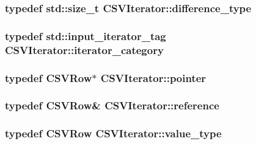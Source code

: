 \subsubsection[{\texorpdfstring{difference\+\_\+type}{difference_type}}]{\setlength{\rightskip}{0pt plus 5cm}typedef std\+::size\+\_\+t {\bf C\+S\+V\+Iterator\+::difference\+\_\+type}}\hypertarget{class_c_s_v_iterator_a2decbf132c26754c9a32402b7bc9848f}{}\label{class_c_s_v_iterator_a2decbf132c26754c9a32402b7bc9848f}
\subsubsection[{\texorpdfstring{iterator\+\_\+category}{iterator_category}}]{\setlength{\rightskip}{0pt plus 5cm}typedef std\+::input\+\_\+iterator\+\_\+tag {\bf C\+S\+V\+Iterator\+::iterator\+\_\+category}}\hypertarget{class_c_s_v_iterator_a1e8e34ec6798b67292c1b1b9bf18e8f6}{}\label{class_c_s_v_iterator_a1e8e34ec6798b67292c1b1b9bf18e8f6}
\subsubsection[{\texorpdfstring{pointer}{pointer}}]{\setlength{\rightskip}{0pt plus 5cm}typedef {\bf C\+S\+V\+Row}$\ast$ {\bf C\+S\+V\+Iterator\+::pointer}}\hypertarget{class_c_s_v_iterator_a23ee3d00badf18d56739868b4f0c0240}{}\label{class_c_s_v_iterator_a23ee3d00badf18d56739868b4f0c0240}
\subsubsection[{\texorpdfstring{reference}{reference}}]{\setlength{\rightskip}{0pt plus 5cm}typedef {\bf C\+S\+V\+Row}\& {\bf C\+S\+V\+Iterator\+::reference}}\hypertarget{class_c_s_v_iterator_a4f99b48a9e06dec230dda0b073d07d9e}{}\label{class_c_s_v_iterator_a4f99b48a9e06dec230dda0b073d07d9e}
\subsubsection[{\texorpdfstring{value\+\_\+type}{value_type}}]{\setlength{\rightskip}{0pt plus 5cm}typedef {\bf C\+S\+V\+Row} {\bf C\+S\+V\+Iterator\+::value\+\_\+type}}\hypertarget{class_c_s_v_iterator_a86931db4489064aa95164fee9123d40e}{}\label{class_c_s_v_iterator_a86931db4489064aa95164fee9123d40e}


